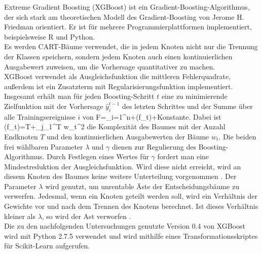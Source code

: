 Extreme Gradient Boosting (XGBoost) \cite{DBLP:journals/corr/ChenG16} ist ein Gradient-Boosting-Algorithmus, der sich stark am theoretischen Modell des Gradient-Boosting von Jerome H. Friedman \cite{Friedman00greedyfunction} orientiert. Er ist f\"ur mehrere Programmierplattformen implementiert, beispielsweise R und Python.\\
Es werden CART-B\"aume verwendet, die in jedem Knoten nicht nur die Trennung der Klassen speichern, sondern jedem Knoten auch einen kontinuierlichen Ausgabewert zuweisen, um die Vorhersage quantitativer zu machen.\\
XGBoost verwendet als Ausgleichsfunktion die mittleren Fehlerquadrate, au\ss erdem ist ein Zusatzterm mit Regularisierungsfunktion implementiert. Insgesamt erh\"alt man f\"ur jeden Boosting-Schritt $t$ eine zu minimierende Zielfunktion mit der Vorhersage $\hat y_i^{t-1}$ des letzten Schrittes und der Summe \"uber alle Trainingsereignisse $i$ von
\beq
F=\sum_{i=1}^n+\Omega\left(f_t\right)+Konstante.
\label{eq:xgb_zielfkt}
\eeq
Dabei ist
\beq
\Omega\left(f_t\right)=\gamma T+\lambda\sum_{j_1}^T w_t^2
\label{eq:complexity}
\eeq
die Komplexit\"at des Baumes mit der Anzahl Endknoten $T$ und den kontinuierlichen Ausgabewerten der B\"aume $w_t$. Die beiden frei w\"ahlbaren Parameter $\lambda$ und $\gamma$ dienen zur Regulierung des Boosting-Algorithmus. Durch Festlegen eines Wertes f\"ur $\gamma$ fordert man eine Mindestreduktion der Ausgleichsfunktion. Wird diese nicht erreicht, wird an diesem Knoten des Baumes keine weitere Unterteilung vorgenommen \cite{xgb_skl_wrapper}. Der Parameter $\lambda$ wird genutzt, um unrentable \"Aste der Entscheidungsb\"aume zu verwerfen. Jedesmal, wenn ein Knoten geteilt werden soll, wird ein Verh\"altnis der Gewichte vor und nach dem Trennen des Knotens berechnet. Ist dieses Verh\"altnis kleiner als $\lambda$, so wird der Ast verworfen \cite{xgb_tree}.\\
Die zu den nachfolgenden Untersuchungen genutzte Version 0.4 von XGBoost wird mit Python 2.7.5 verwendet und wird mithilfe eines Transformationsskriptes f\"ur Scikit-Learn aufgerufen.
